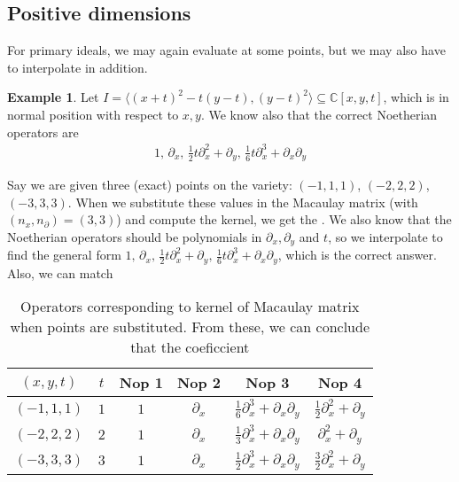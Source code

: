 \documentclass[letterpaper]{article}
\theoremstyle{plain}
\theoremstyle{definition}
\newtheorem{example}[theorem]{Example}
\theoremstyle{remark}
\begin{document}
\subsection{Positive dimensions} %
\label{sub:positive_dimensions}
For primary ideals, we may again evaluate at some points, but we may also have to interpolate in addition.
\begin{example}
	Let $I = \langle (x+t)^2-t(y-t), (y-t)^2 \rangle \subseteq \mathbb{C}[x,y,t]$, which is in normal position with respect to $x,y$. We know also that the correct Noetherian operators are
	\begin{align*}
		1,\,\partial_x,\,\frac{1}{2}t \partial_x^2 + \partial_y,\, \frac{1}{6}t \partial_x^3 + \partial_x \partial_y
	\end{align*}

	Say we are given three (exact) points on the variety: $(-1,1,1)$, $(-2,2,2)$, $(-3,3,3)$. When we substitute these values in the Macaulay matrix (with $(n_x,n_\partial) = (3,3)$) and compute the kernel, we get the . We also know that the Noetherian operators should be polynomials in $\partial_x,\partial_y$ and $t$, so we interpolate to find the general form $1,\,\partial_x,\,\frac{1}{2}t \partial_x^2 + \partial_y,\, \frac{1}{6}t \partial_x^3 + \partial_x \partial_y$, which is the correct answer. Also, we can match
	\begin{table}[h!]
		\centering
		\begin{tabular}{cccccc}
		\toprule
		$(x,y,t)$ & $t$ & Nop 1 & Nop 2 & Nop 3 & Nop 4\\
		\midrule
		$(-1,1,1)$ & $1$ & $1$ & $\partial_x$ & $\frac{1}{6}\partial_x^3 + \partial_x \partial_y$ & $\frac{1}{2}\partial_x^2 + \partial_y$\\
		$(-2,2,2)$ & $2$ & $1$ & $\partial_x$ & $\frac{1}{3}\partial_x^3 + \partial_x \partial_y$ & $\partial_x^2 + \partial_y$\\
		$(-3,3,3)$ & $3$ & $1$ & $\partial_x$ & $\frac{1}{2}\partial_x^3 + \partial_x \partial_y$ & $\frac{3}{2}\partial_x^2 + \partial_y$\\
		\bottomrule
		\end{tabular}
		\caption{Operators corresponding to kernel of Macaulay matrix when points are substituted. From these, we can conclude that the coeficcient}
		\label{tbl:ex_pos_dim_num_exact}
	\end{table}
\end{example}
\end{document}
